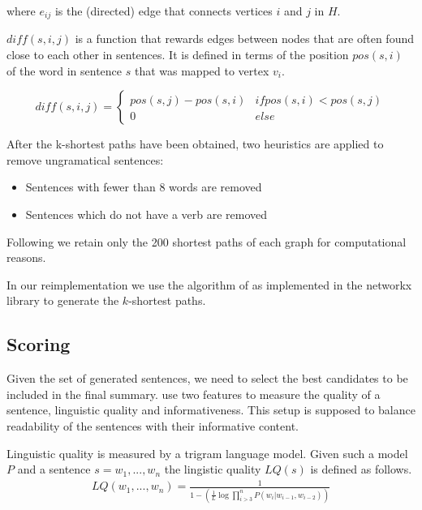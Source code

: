 \documentclass[a4paper,BCOR=10mm]{report}
\numberwithin{lemma}{chapter}
\numberwithin{definition}{chapter}
\begin{document}
where $e_{ij}$ is the (directed) edge that connects vertices $i$ and $j$ in $H$.

$\mathit{diff}(s, i, j)$ is a function that rewards edges between nodes that are often found close to each other in sentences. It is defined in terms of the position $\mathit{pos}(s, i)$ of the word in sentence $s$ that was mapped to vertex $v_i$.

\begin{equation}
\mathit{diff}(s, i, j) = \begin{cases}
\mathit{pos}(s, j) - \mathit{pos}(s, i) & \mathit{if }\mathit{pos}(s, i) < \mathit{pos}(s, j) \\
0 & \mathit{else}
\end{cases}
\end{equation}

After the k-shortest paths have been obtained, two heuristics are applied to remove ungramatical sentences:

\begin{itemize}
    \item {Sentences with fewer than $8$ words are removed}
    \item {Sentences which do not have a verb are removed}
\end{itemize}

Following \citet{banerjee} we retain only the 200 shortest paths of each graph for computational reasons.

In our reimplementation we use the algorithm of \citet{kshortestpath} as implemented in the networkx library \citep{networkx} to generate the $k$-shortest paths.

\subsection{Scoring} \label{sec:baseline-scoring}

Given the set of generated sentences, we need to select the best candidates to be included in the final summary. \citet{banerjee} use two features to measure the quality of a sentence, linguistic quality and informativeness. This setup is supposed to balance readability of the sentences with their informative content.

Linguistic quality is measured by a trigram language model. Given such a model $P$ and a sentence $s = w_1, ..., w_n$ the lingistic quality $LQ(s)$ is defined as follows.
\begin{align}
LQ(w_1, ..., w_n) = \frac{1}{1 - (\frac{1}{L} \log \prod_{i > 3}^{n} P(w_i | w_{i - 1}, w_{i - 2}))}
\end{align}
\end{document}
